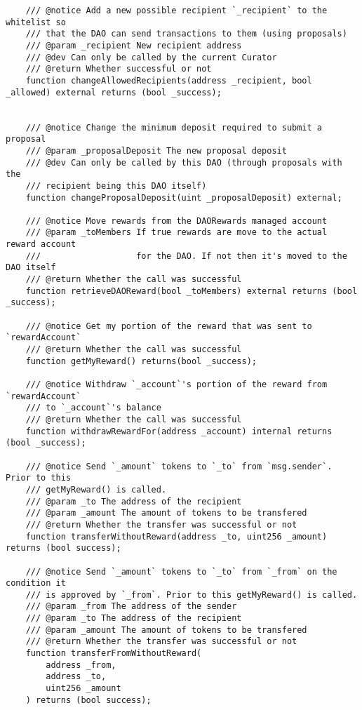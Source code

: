 \documentclass[9pt,oneside]{amsart}
\begin{document}
\begin{appendix}
\begin{verbatim}
    /// @notice Add a new possible recipient `_recipient` to the whitelist so
    /// that the DAO can send transactions to them (using proposals)
    /// @param _recipient New recipient address
    /// @dev Can only be called by the current Curator
    /// @return Whether successful or not
    function changeAllowedRecipients(address _recipient, bool _allowed) external returns (bool _success);


    /// @notice Change the minimum deposit required to submit a proposal
    /// @param _proposalDeposit The new proposal deposit
    /// @dev Can only be called by this DAO (through proposals with the
    /// recipient being this DAO itself)
    function changeProposalDeposit(uint _proposalDeposit) external;

    /// @notice Move rewards from the DAORewards managed account
    /// @param _toMembers If true rewards are move to the actual reward account
    ///                   for the DAO. If not then it's moved to the DAO itself
    /// @return Whether the call was successful
    function retrieveDAOReward(bool _toMembers) external returns (bool _success);

    /// @notice Get my portion of the reward that was sent to `rewardAccount`
    /// @return Whether the call was successful
    function getMyReward() returns(bool _success);

    /// @notice Withdraw `_account`'s portion of the reward from `rewardAccount`
    /// to `_account`'s balance
    /// @return Whether the call was successful
    function withdrawRewardFor(address _account) internal returns (bool _success);

    /// @notice Send `_amount` tokens to `_to` from `msg.sender`. Prior to this
    /// getMyReward() is called.
    /// @param _to The address of the recipient
    /// @param _amount The amount of tokens to be transfered
    /// @return Whether the transfer was successful or not
    function transferWithoutReward(address _to, uint256 _amount) returns (bool success);

    /// @notice Send `_amount` tokens to `_to` from `_from` on the condition it
    /// is approved by `_from`. Prior to this getMyReward() is called.
    /// @param _from The address of the sender
    /// @param _to The address of the recipient
    /// @param _amount The amount of tokens to be transfered
    /// @return Whether the transfer was successful or not
    function transferFromWithoutReward(
        address _from,
        address _to,
        uint256 _amount
    ) returns (bool success);


\end{verbatim}
\end{appendix}
\end{document}
